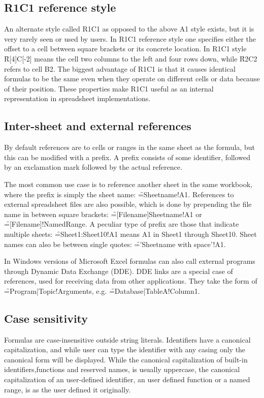 \subsection{R1C1 reference style}

An alternate style called R1C1 as opposed to the above A1 style exists, but it is very rarely seen or used by users.
In R1C1 reference style one specifies either the offset to a cell between square brackets or its concrete location.
In R1C1 style \f{R[4]C[-2]} means the cell two columns to the left and four rows down, while \f{R2C2} refers to cell B2.
The biggest advantage of R1C1 is that it causes identical formulas to be the same even when they operate on different cells or data because of their position.
These properties make R1C1 useful as an internal representation in spreadsheet implementations.

\subsection{Inter-sheet and external references}
\label{subsection:ExternalRefsDDE}

By default references are to cells or ranges in the same sheet as the formula, but this can be modified with a prefix. A prefix consists of some identifier, followed by an exclamation mark followed by the actual reference.

The most common use case is to reference another sheet in the same workbook, where the prefix is simply the sheet name: \f{=Sheetname!A1}.
References to external spreadsheet files are also possible, which is done by prepending the file name in between square brackets: \f{=[Filename]Sheetname!A1} or \f{=[Filename]!NamedRange}.
A peculiar type of prefix are those that indicate multiple sheets: \f{=Sheet1:Sheet10!A1} means A1 in Sheet1 through Sheet10.
Sheet names can also be between single quotes: \f{='Sheetname with space'!A1}. 

In Windows versions of Microsoft Excel formulas can also call external programs through Dynamic Data Exchange (DDE).
DDE links are a special case of references, used for receiving data from other applications.
They take the form of \f{=Program|Topic!Arguments}, e.g. \f{=Database|TableA!Column1}.

\subsection{Case sensitivity}

Formulas are case-insensitive outside string literals.
Identifiers have a canonical capitalization, and while user can type the identifier with any casing only the canonical form will be displayed.
While the canonical capitalization of built-in identifiers,functions and reserved names, is usually uppercase, the canonical capitalization of an user-defined identifier, an user defined function or a named range, is as the user defined it originally.

